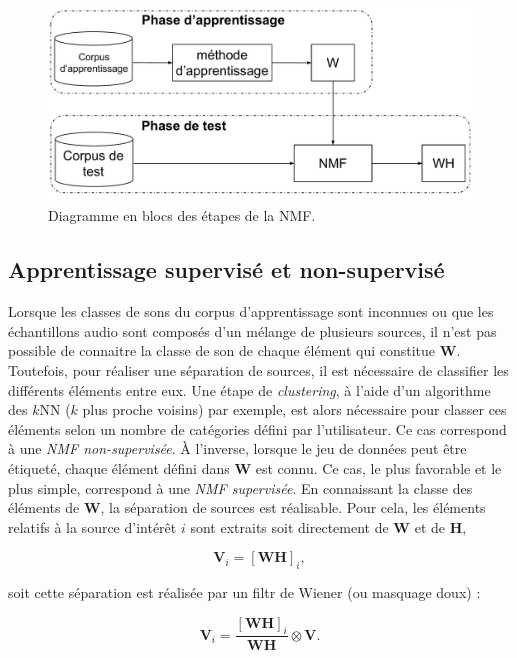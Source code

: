 \begin{figure}[ht]
\centering
\includegraphics[width=.8\linewidth]{./figures/NMF/NMF_apprentissage.pdf}
\caption{Diagramme en blocs des étapes de la NMF.}
\label{fig:supervised_learning}
\end{figure}

\subsection{Apprentissage supervisé et non-supervisé}
Lorsque les classes de sons du corpus d'apprentissage sont inconnues ou que les échantillons audio sont composés d'un mélange de plusieurs sources, il n'est pas possible de connaitre la classe de son de chaque élément qui constitue $\mathbf{W}$. Toutefois, pour réaliser une séparation de sources, il est nécessaire de classifier les différents éléments entre eux. Une étape de \textit{clustering}, à l'aide d'un algorithme des $k$NN ($k$ plus proche voisins) par exemple, est alors nécessaire pour classer ces éléments selon un nombre de catégories défini par l'utilisateur. Ce cas correspond à une \textit{NMF non-supervisée}.
À l'inverse, lorsque le jeu de données peut être étiqueté, chaque élément défini dans $\mathbf{W}$ est connu. Ce cas, le plus favorable et le plus simple, correspond à une \textit{NMF supervisée}.
En connaissant la classe des éléments de $\mathbf{W}$, la séparation de sources est réalisable. Pour cela, les éléments relatifs à la source d'intérêt $i$ sont extraits soit directement de $\mathbf{W}$ et de $\mathbf{H}$,

\begin{equation}\label{eq:WH_trafic}
\mathbf{V}_i = \left[\mathbf{WH}\right]_i,
\end{equation}

soit cette séparation est réalisée par un filtr de Wiener (ou masquage doux) :

\begin{equation}
\mathbf{V}_i = \frac{\left[\mathbf{WH}\right]_i}{\mathbf{WH}} \otimes \mathbf{V}.
\end{equation}
\\

